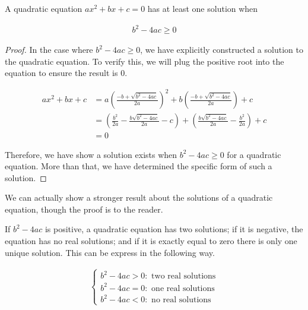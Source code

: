 \documentclass[twoside]{report}
\begin{document}
\vspace{\baselineskip}
\begin{theorem}
	A quadratic equation $ax^2 + bx + c = 0$ has at least one solution when
	
	\begin{align}
		b^2 - 4ac \ge 0
	\end{align}
\end{theorem}

\begin{proof}
	In the case where $b^2 - 4ac \ge 0$, we have explicitly constructed a solution to the quadratic equation. To verify this, we will plug the positive root into the equation to ensure the result is 0.
	
	\begin{align*}
		ax^2 + bx + c
		&= a \left( \frac{-b + \sqrt{b^2 - 4ac}}{2a} \right)^2 + b \left( \frac{-b + \sqrt{b^2 - 4ac}}{2a} \right) + c \\
		&= \left( \frac{b^2}{2a} - \frac{b\sqrt{b^2 - 4ac}}{2a} - c\right) + \left( \frac{b\sqrt{b^2 - 4ac}}{2a} - \frac{b^2}{2a}\right) + c \\
		&= 0
	\end{align*}
	
	Therefore, we have show a solution exists when  $b^2 - 4ac \ge 0$ for a quadratic equation. More than that, we have determined the specific form of such a solution.
\end{proof}
\vspace{\baselineskip}

We can actually show a stronger result about the solutions of a quadratic equation, though the proof is to the reader.

\begin{theorem}
	If $b^2 - 4ac$ is positive, a quadratic equation has two solutions; if it is negative, the equation has no real solutions; and if it is exactly equal to zero there is only one unique solution. This can be express in the following way.
	
	\begin{align*}
		\begin{cases}
			b^2 - 4ac > 0 : \text{ two real solutions} \\
			b^2 - 4ac = 0 : \text{ one real solutions} \\
			b^2 - 4ac < 0 : \text{ no real solutions}
		\end{cases}
	\end{align*}
\end{theorem}
\end{document}
